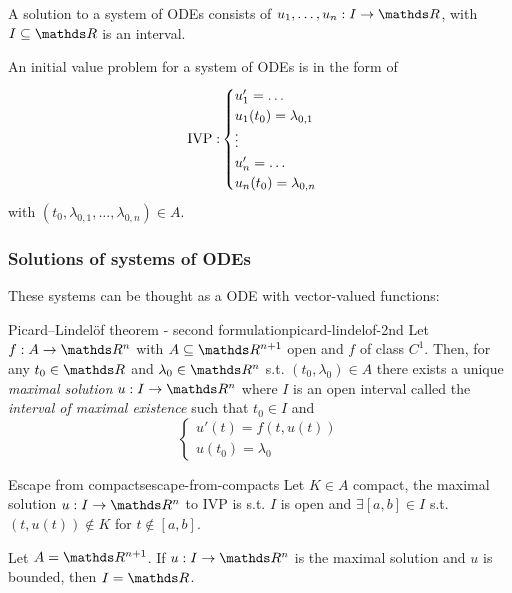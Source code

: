 \documentclass[12pt]{extarticle}
\begin{document}
A solution to a system of ODEs consists of $u_1, \dots, u_n: I \to \R$, with $I \subseteq \R$ is an interval.

An initial value problem for a system of ODEs is in the form of
\begin{equation}
	{\operatorfont IVP:}
	\begin{cases}
		u_1' = \ldots             \\
		u_1(t_0) = \lambda_{0, 1} \\
		\vdots                    \\
		u_n' = \ldots             \\
		u_n(t_0) = \lambda_{0, n} \\
	\end{cases}
\end{equation}
with $(t_0, \lambda_{0,1}, \dots, \lambda_{0,n}) \in A$.

\subsubsection{Solutions of systems of ODEs}

These systems can be thought as a ODE with vector-valued functions:
\begin{theorem}{Picard–Lindelöf theorem - second formulation}{picard-lindelof-2nd}
	Let $f: A \to \R^n$ with $A \subseteq \R^{n+1}$ open and $f$ of class $C^1$.
	Then, for any $t_0 \in \R$ and $\lambda_0 \in \R^n$ s.t. $(t_0, \lambda_0) \in A$ there exists a unique \emph{maximal solution}
	$u: I \to \R^n$
	where $I$ is an open interval called the \emph{interval of maximal existence} such that $t_0 \in I$ and
	\begin{equation}
		\begin{cases}
			u'(t) = f(t, u(t)) \\
			u(t_0) = \lambda_0
		\end{cases}
	\end{equation}
\end{theorem}

\begin{theorem}{Escape from compacts}{escape-from-compacts}
	Let $K \in A$ compact, the maximal solution $u: I \to \R^n$ to IVP is s.t. $I$ is open and $\exists [a, b] \in I$ s.t. $(t, u(t)) \notin K$ for $t \notin [a, b]$.
\end{theorem}

\begin{corollary}{}{}
	Let $A = \R^{n+1}$. If $u: I \to \R^n$ is the maximal solution and $u$ is bounded, then $I = \R$.
\end{corollary}
\end{document}
